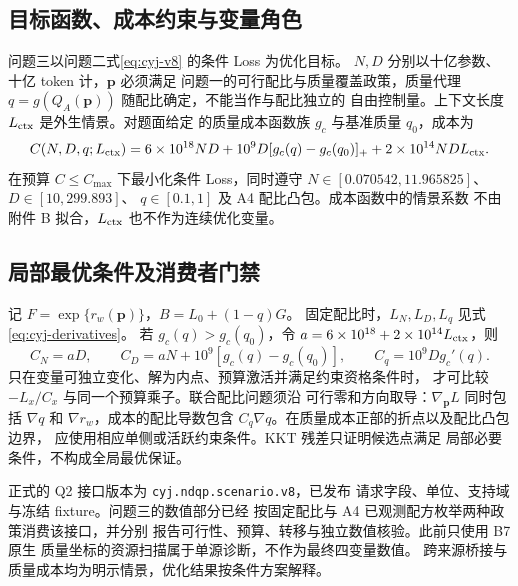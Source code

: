 \subsection{目标函数、成本约束与变量角色}

问题三以问题二式\eqref{eq:cyj-v8} 的条件 Loss 为优化目标。
$N,D$ 分别以十亿参数、十亿 token 计，$\boldsymbol p$ 必须满足
问题一的可行配比与质量覆盖政策，质量代理
$q=g(Q_A(\boldsymbol p))$ 随配比确定，不能当作与配比独立的
自由控制量。上下文长度 $L_{\rm ctx}$ 是外生情景。对题面给定
的质量成本函数族 $g_c$ 与基准质量 $q_0$，成本为
\begin{equation}\label{eq:cyj-q3-cost}
C(N,D,q;L_{\rm ctx})=6\times10^{18}ND
+10^{9}D[g_c(q)-g_c(q_0)]_+
+2\times10^{14}NDL_{\rm ctx}.
\end{equation}
在预算 $C\leq C_{\max}$ 下最小化条件 Loss，同时遵守
$N\in[0.070542,11.965825]$、$D\in[10,299.893]$、
$q\in[0.1,1]$ 及 A4 配比凸包。成本函数中的情景系数
不由附件 B 拟合，$L_{\rm ctx}$ 也不作为连续优化变量。

\subsection{局部最优条件及消费者门禁}

记 $F=\exp\{r_w(\boldsymbol p)\}$，$B=L_0+(1-q)G$。
固定配比时，$L_N,L_D,L_q$ 见式\eqref{eq:cyj-derivatives}。
若 $g_c(q)>g_c(q_0)$，令
$a=6\times10^{18}+2\times10^{14}L_{\rm ctx}$，则
\begin{equation}
C_N=aD,\qquad C_D=aN+10^9[g_c(q)-g_c(q_0)],\qquad
C_q=10^9Dg_c'(q).
\end{equation}
只在变量可独立变化、解为内点、预算激活并满足约束资格条件时，
才可比较 $-L_x/C_x$ 与同一个预算乘子。联合配比问题须沿
可行零和方向取导：$\nabla_{\boldsymbol p}L$ 同时包括
$\nabla q$ 和 $\nabla r_w$，成本的配比导数包含
$C_q\nabla q$。在质量成本正部的折点以及配比凸包边界，
应使用相应单侧或活跃约束条件。KKT 残差只证明候选点满足
局部必要条件，不构成全局最优保证。

正式的 Q2 接口版本为 \texttt{cyj.ndqp.scenario.v8}，已发布
请求字段、单位、支持域与冻结 fixture。问题三的数值部分已经
按固定配比与 A4 已观测配方枚举两种政策消费该接口，并分别
报告可行性、预算、转移与独立数值核验。此前只使用 B7 原生
质量坐标的资源扫描属于单源诊断，不作为最终四变量数值。
跨来源桥接与质量成本均为明示情景，优化结果按条件方案解释。

